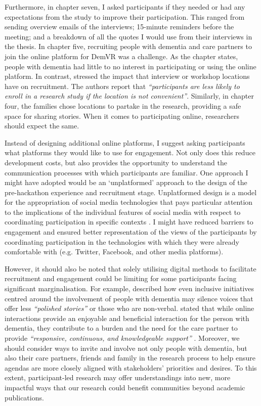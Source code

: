 Furthermore, in chapter seven, I asked participants if they needed or had any expectations from the study to improve their participation. This ranged from sending overview emails of the interviews; 15-minute reminders before the meeting; and a breakdown of all the quotes I would use from their interviews in the thesis. In chapter five, recruiting people with dementia and care partners to join the online platform for DemVR was a challenge. As the chapter states, people with dementia had little to no interest in participating or using the online platform. In contrast, \cite{namageyo2014recruitment} stressed the impact that interview or workshop locations have on recruitment. The authors report that \textit{``participants are less likely to enroll in a research study if the location is not convenient''}. Similarly, in chapter four, the families chose locations to partake in the research, providing a safe space for sharing stories. When it comes to participating online, researchers should expect the same.  

Instead of designing additional online platforms, I suggest asking participants what platforms they would like to use for engagement. Not only does this reduce development costs, but also provides the opportunity to understand the communication processes with which participants are familiar. One approach I might have adopted would be an ‘unplatformed’ approach to the design of the pre-hackathon experience and recruitment stage. Unplatformed design is a model for the appropriation of social media technologies that pays particular attention to the implications of the individual features of social media with respect to coordinating participation in specific contexts \citep{lambton-howard_unplatformed_2020}. I might have reduced barriers to engagement and ensured better representation of the views of the participants by coordinating participation in the technologies with which they were already comfortable with (e.g. Twitter, Facebook, and other media platforms). 

However, it should also be noted that solely utilising digital methods to facilitate recruitment and engagement could be limiting for some participants facing significant marginalisation. For example, \cite{lazar_safe_2019} described how even inclusive initiatives centred around the involvement of people with dementia may silence voices that offer less \textit{``polished stories''} or those who are non-verbal. \cite{dai2020making} stated that while online interactions provide an enjoyable and beneficial interaction for the person with dementia, they contribute to a burden and the need for the care partner to provide \textit{``responsive, continuous, and knowledgeable support'' }\citep[p. 46:24]{hwang2020exploring}. Moreover, we should consider ways to invite and involve not only people with dementia, but also their care partners, friends and family in the research process to help ensure agendas are more closely aligned with stakeholders’ priorities and desires. To this extent, participant-led research may offer understandings into new, more impactful ways that our research could benefit communities beyond academic publications.

